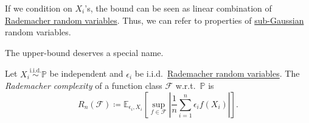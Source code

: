 \begin{intuition}
	If we condition on \(X_i\)'s, the bound can be seen as linear combination of \hyperref[eg:Rademacher-random-varaible]{Rademacher random variables}. Thus, we can refer to properties of \hyperref[def:sub-Gaussian]{sub-Gaussian} random variables.
\end{intuition}

The upper-bound deserves a special name.

\begin{definition}\label{def:Rademacher-complexity}
	Let \(X_i \overset{\text{i.i.d.} }{\sim } \mathbb{P} \) be independent and \(\epsilon _i\) be i.i.d.\ \hyperref[eg:Rademacher-random-varaible]{Rademacher random variables}. The \emph{Rademacher complexity} of a function class \(\mathscr{F} \) w.r.t.\ \(\mathbb{P} \) is
	\[
		R_n(\mathscr{F} ) \coloneqq \mathbb{E}_{\epsilon _i, X_i}\left[\sup _{f\in \mathscr{F} }\left\vert \frac{1}{n}\sum_{i=1}^{n} \epsilon _i f(X_i) \right\vert  \right] .
	\]
\end{definition}

